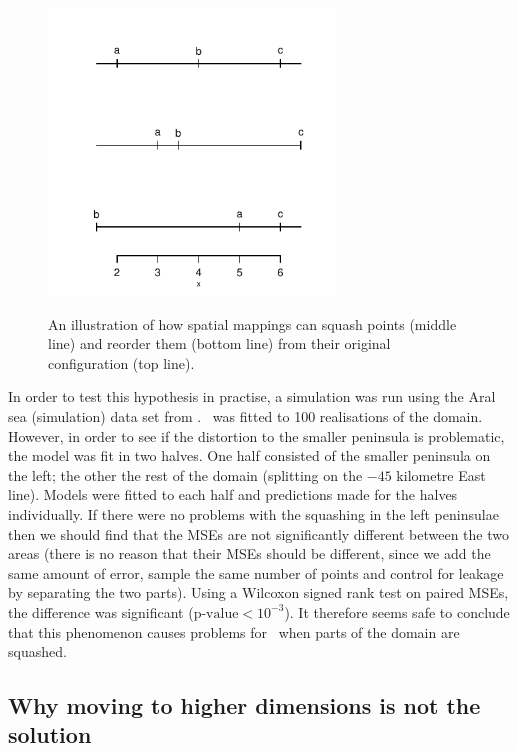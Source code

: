 {\begin{figure}
\centering
\includegraphics[width=3in]{mds/figs/linedia.pdf} \\
\caption{An illustration of how spatial mappings can squash points (middle line) and reorder them (bottom line) from their original configuration (top line).}
\label{linedia}
\end{figure}

In order to test this hypothesis in practise, a simulation was run using the Aral sea (simulation) data set from . \mdsap\ was fitted to 100 realisations of the domain. However, in order to see if the distortion to the smaller peninsula is problematic, the model was fit in two halves. One half consisted of the smaller peninsula on the left; the other the rest of the domain (splitting on the $-45$ kilometre East line). Models were fitted to each half and predictions made for the halves individually. If there were no problems with the squashing in the left peninsulae then we should find that the MSEs are not significantly different between the two areas (there is no reason that their MSEs should be different, since we add the same amount of error, sample the same number of points and control for leakage by separating the two parts). Using a Wilcoxon signed rank test on paired MSEs, the difference was significant ($\text{p-value} < 10^{-3}$). It therefore seems safe to conclude that this phenomenon causes problems for \mdsap\ when parts of the domain are squashed.

\subsection{Why moving to higher dimensions is not the solution}
\label{nohigherdim}

}
